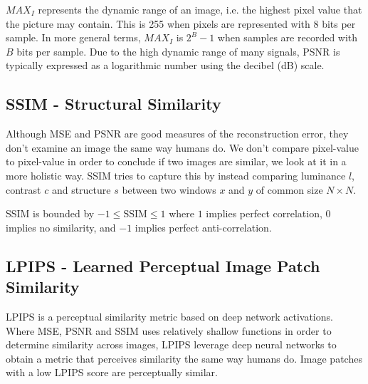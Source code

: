 

$MAX_I$ represents the dynamic range of an image, i.e. the highest pixel value that the picture may contain. This is 255 when pixels are represented with 8 bits per sample. In more general terms, $MAX_I$ is $2^B-1$ when samples are recorded with $B$ bits per sample. Due to the high dynamic range of many signals, PSNR is typically expressed as a logarithmic number using the decibel (dB) scale.

\subsection{SSIM - Structural Similarity}
Although MSE and PSNR are good measures of the reconstruction error, they don't examine an image the same way humans do. We don't compare pixel-value to pixel-value in order to conclude if two images are similar, we look at it in a more holistic way. SSIM tries to capture this by instead comparing luminance $l$, contrast $c$ and structure $s$ between two windows $x$ and $y$ of common size $N \times N$.



\begin{comment}
\begin{itemize}
    \item $\mu$ represents the pixel sample mean for both $x$ and $y$,
    \item $\sigma^2$ represents the variance for both $x$ and $y$,
    \item $\sigma_{xy}$ represents the covariance of x and y,
    \item $c_1 = (k_1L)^2$, $c_2 = (k_2L)^2$ are variables to stabilize the division with weak denominator,
    \item $L$ represents the dynamic range of the pixel-values,
    \item $k_1 = 0.01$, $k_2 = 0.03$ by default   
\end{itemize}
\end{comment}

SSIM is bounded by $-1 \leq \text{SSIM} \leq 1$ where $1$ implies perfect correlation, $0$ implies no similarity, and $-1$ implies perfect anti-correlation.

\subsection{LPIPS - Learned Perceptual Image Patch Similarity \cite{zhang_unreasonable_2018}}
LPIPS is a perceptual similarity metric based on deep network activations. Where MSE, PSNR and SSIM uses relatively shallow functions in order to determine similarity across images, LPIPS leverage deep neural networks to obtain a metric that perceives similarity the same way humans do. Image patches with a low LPIPS score are perceptually similar.




